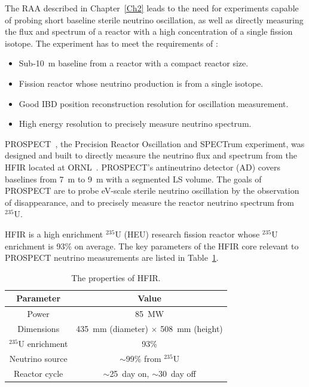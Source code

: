     
    The RAA described in Chapter~\ref{Ch2} leads to the need for experiments capable of probing short baseline sterile neutrino oscillation, as well as directly measuring the flux and spectrum of a  reactor with a high concentration of a single fission isotope. 
    The experiment has to meet the requirements of :
    \begin{itemize}
        \item Sub-10~m baseline from a reactor with a compact reactor size. 
        \item Fission reactor whose neutrino production is from a single isotope.
        \item Good IBD position reconstruction resolution for oscillation measurement.
        \item High energy resolution to precisely measure neutrino spectrum.
    \end{itemize}
    
    PROSPECT~\cite{bib:prospect_physics, bib:prospect_nim}, the Precision Reactor Oscillation and SPECTrum experiment, was designed and built to directly measure the neutrino flux and spectrum from the HFIR located at ORNL~\cite{bib:hfir}. 
    PROSPECT's antineutrino detector (AD) covers baselines from 7~m to 9~m with a segmented LS volume.
    The goals of PROSPECT are to probe eV-scale sterile neutrino oscillation by the observation of \nuebar disappearance, and to precisely measure the  reactor neutrino spectrum from $^{235}$U.
    

    HFIR is a high enrichment $^{235}$U (HEU) research fission reactor whose $^{235}$U enrichment is 93\% on average.
    The key parameters of the HFIR core relevant to PROSPECT neutrino measurements are listed in Table~\ref{tab:HFIR}.
\begin{table}[h]
    \centering
    \caption[The properties of HFIR]{The properties of HFIR.}
    \begin{tabular}{cc}
    \hline
    \hline
    Parameter  & Value   \\
    \hline
    Power    & 85~MW \\
    Dimensions     & 435~mm (diameter) $\times$ 508~mm (height) \\
    $^{235}$U enrichment & 93\% \\
    Neutrino source & $\sim$99\% from $^{235}$U \\
    Reactor cycle & $\sim$25~day on, $\sim$30~day off \\
    \hline
    \end{tabular}

\label{tab:HFIR}
\end{table}

